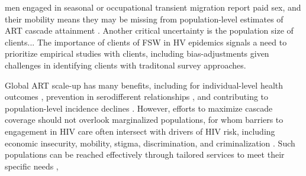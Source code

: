 men engaged in seasonal or occupational transient migration report paid sex, and their mobility %
means they may be missing from population-level estimates of ART cascade attainment  %
\cite{Akullian2017,Camlin2019}. Another critical uncertainty is the population size of clients...
The importance of clients of FSW in HV epidemics signals a need to prioritize empirical studies with clients, 
including bias-adjustments given challenges in identifying clients with traditonal survey approaches. %
\par
Global ART scale-up has many benefits, including for  %
individual-level health outcomes \cite{Gabillard2013,Lundgren2015init},
prevention in serodifferent relationships \cite{Cohen2016},
and contributing to population-level incidence declines \cite{Havlir2020}.
However, efforts to maximize cascade coverage should not overlook marginalized populations,
for whom barriers to engagement in HIV care often intersect with drivers of HIV risk,
including economic insecurity, mobility, stigma, discrimination, and criminalization
\cite{Wanyenze2016,Schwartz2017,Schmidt-Sane2022,Camlin2019,Baral2019}.
Such populations can be reached effectively through
tailored services to meet their specific needs \cite{Ehrenkranz2019},
